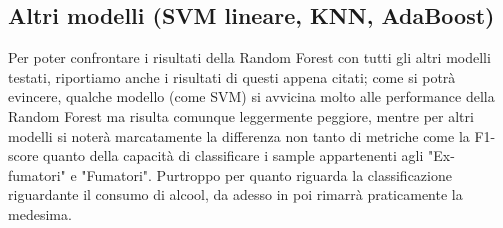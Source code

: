 \subsection{Altri modelli (SVM lineare, KNN, AdaBoost)}

Per poter confrontare i risultati della Random Forest con tutti gli altri modelli testati, riportiamo anche i risultati di questi appena citati; come si potrà evincere, qualche modello (come SVM) si avvicina molto alle performance della Random Forest ma risulta comunque leggermente peggiore, mentre per altri modelli si noterà marcatamente la differenza non tanto di metriche come la F1-score quanto della capacità di classificare i sample appartenenti agli "Ex-fumatori" e "Fumatori".
Purtroppo per quanto riguarda la classificazione riguardante il consumo di alcool, da adesso in poi rimarrà praticamente la medesima.

